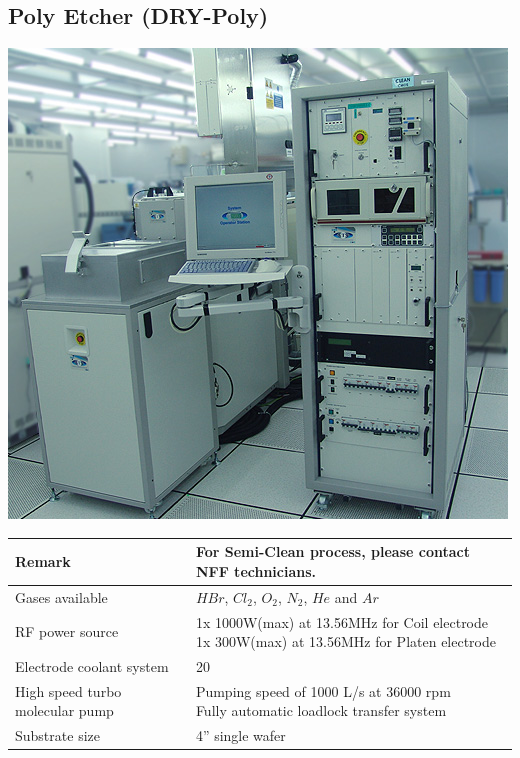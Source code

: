 \subsection{Poly Etcher (DRY-Poly)}\label{poly_etcher_machine}
\WaferClean\WaferSemiClean

\begin{minipage}[H]{\MachinePictureMiniPageWidth}
	\includegraphics[width=\MachinePictureWidth]{pictures_machines/poly_etcher.png}
\end{minipage}\begin{minipage}[H]{\MachineTextMiniPageWidth}
	\begin{tabular}{|p{3cm}|p{8cm}|}
		\hline
		Remark &
		For Semi-Clean process, please contact NFF technicians. \\
		\hline
		Gases available &
		$H Br$, $Cl_2$, $O_2$, $N_2$, $He$ and $Ar$ \\
		\hline
		RF power source &
		\makecell[l]{
			\tabitem 1x 1000W(max) at 13.56MHz for Coil electrode \\
			\tabitem 1x 300W(max)  at 13.56MHz for Platen electrode
		} \\
		\hline
		Electrode coolant system &
		20 \degreesC \\
		\hline
		High speed turbo molecular pump &
		\makecell[l]{
			\tabitem Pumping speed of 1000 L/s at 36000 rpm \\
			\tabitem Fully automatic loadlock transfer system
		} \\
		\hline
		Substrate size &
		4” single wafer \\
		\hline
	\end{tabular}


\end{minipage}
